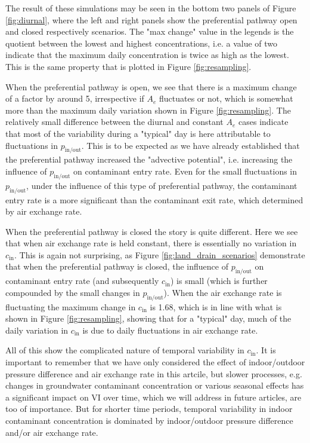 \documentclass[journal=esthag,manuscript=article]{achemso}
\begin{document}
The result of these simulations may be seen in the bottom two panels of Figure \ref{fig:diurnal}, where the left and right panels show the preferential pathway open and closed respectively scenarios.
The "max change" value in the legends is the quotient between the lowest and highest concentrations, i.e. a value of two indicate that the maximum daily concentration is twice as high as the lowest.
This is the same property that is plotted in Figure \ref{fig:resampling}.

When the preferential pathway is open, we see that there is a maximum change of a factor by around 5, irrespective if $A_e$ fluctuates or not, which is somewhat more than the maximum daily variation shown in Figure \ref{fig:resampling}.
The relatively small difference between the diurnal and constant $A_e$ cases indicate that most of the variability during a "typical" day is here attributable to fluctuations in $p_\mathrm{in/out}$.
This is to be expected as we have already established that the preferential pathway increased the "advective potential", i.e. increasing the influence of $p_\mathrm{in/out}$ on contaminant entry rate.
Even for the small fluctuations in $p_\mathrm{in/out}$, under the influence of this type of preferential pathway, the contaminant entry rate is a more significant than the contaminant exit rate, which determined by air exchange rate.

When the preferential pathway is closed the story is quite different.
Here we see that when air exchange rate is held constant, there is essentially no variation in $c_\mathrm{in}$.
This is again not surprising, as Figure \ref{fig:land_drain_scenarios} demonstrate that when the preferential pathway is closed, the influence of $p_\mathrm{in/out}$ on contaminant entry rate (and subsequently $c_\mathrm{in}$) is small (which is further compounded by the small changes in $p_\mathrm{in/out}$).
When the air exchange rate is fluctuating the maximum change in $c_\mathrm{in}$ is 1.68, which is in line with what is shown in Figure \ref{fig:resampling}, showing that for a "typical" day, much of the daily variation in $c_\mathrm{in}$ is due to daily fluctuations in air exchange rate.

All of this show the complicated nature of temporal variability in $c_\mathrm{in}$.
It is important to remember that we have only considered the effect of indoor/outdoor pressure difference and air exchange rate in this artcile, but slower processes, e.g. changes in groundwater contaminant concentration or various seasonal effects has a significant impact on VI over time, which we will address in future articles, are too of importance.
But for shorter time periods, temporal variability in indoor contaminant concentration is dominated by indoor/outdoor pressure difference and/or air exchange rate.
\end{document}
